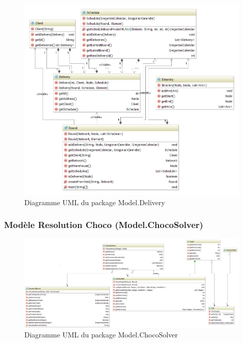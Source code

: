 \begin{figure}[h]
    \centering
    \includegraphics[width=160mm]{../diagrams/classes_packages/classes_packages/model/delivery.png}
    \caption{Diagramme UML du package Model.Delivery}
    \label{diagram:uml_model_delivery}
\end{figure}
\pagebreak

\begin{landscape}
\subsubsection{Mod\`ele Resolution Choco (Model.ChocoSolver)}

\begin{figure}[h]
    \centering
    \includegraphics[width=240mm]{../diagrams/classes_packages/classes_packages/model/chocoSolver.png}
    \caption{Diagramme UML du package Model.ChocoSolver}
    \label{diagram:uml_model_choco}
\end{figure}
\end{landscape}
\pagebreak

